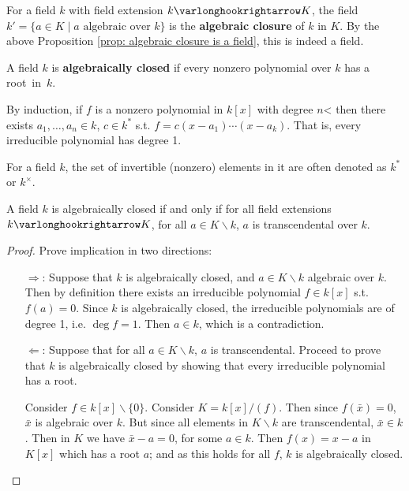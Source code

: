 \documentclass{article}
\begin{document}
\begin{definition}
    For a field $k$ with field extension $k \ext K$, the field $k' = \{a \in K \mid \text{$a$ algebraic over $k$}\}$ is the \textbf{algebraic closure} of $k$ in $K$. By the above Proposition \ref{prop: algebraic closure is a field}, this is indeed a field.
\end{definition}
\nogap
\begin{definition}
    A field $k$ is \textbf{algebraically closed} if every nonzero polynomial over $k$ has a \mbox{root in $k$.}
\end{definition}

\begin{remark}
    By induction, if $f$ is a nonzero polynomial in $k[x]$ with degree $n$< then there exists $a_1, \dots, a_n \in k$, $c \in k^{\ast}$ s.t. $f = c(x - a_1) \cdots (x - a_k)$. That is, every irreducible polynomial has degree 1.
\end{remark}

\begin{notation}
    For a field $k$, the set of invertible (nonzero) elements in it are often denoted as $k^{\ast}$ or $k^{\times}$.
\end{notation}

\begin{proposition}
    A field $k$ is algebraically closed if and only if for all field extensions $k \ext K$, for all $a \in K \smallsetminus k$, $a$ is transcendental over $k$.
\end{proposition}

\begin{proof}
    Prove implication in two directions:
    \begin{itemize}
        \item[$\Rightarrow$:] Suppose that $k$ is algebraically closed, and $a \in K \smallsetminus k$ algebraic over $k$. Then by definition there exists an irreducible polynomial $f \in k[x]$ s.t. $f(a) = 0$. Since $k$ is algebraically closed, the irreducible polynomials are of degree 1, i.e. $\deg f = 1$. Then $a \in k$, which is a contradiction.
        \item[$\Leftarrow$:] Suppose that for all $a \in K \smallsetminus k$, $a$ is transcendental. Proceed to prove that $k$ is algebraically closed by showing that every irreducible polynomial has a root. 
        
        Consider $f \in k[x] \smallsetminus \{0\}$. Consider $K = k[x]/(f)$. Then since $f(\bar{x}) = 0$, $\bar{x}$ is algebraic over $k$. But since all elements in $K \smallsetminus k$ are transcendental, $\bar{x} \in k$. Then in $K$ we have $\bar{x} - a = 0$, for some $a \in k$. Then $f(x) = x - a$ in $K[x]$ which has a root $a$; and as this holds for all $f$, $k$ is algebraically closed.
    \end{itemize}
\end{proof}
\end{document}
